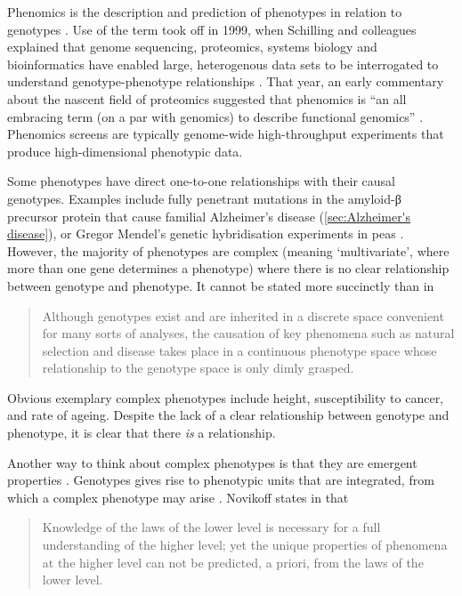 Phenomics is the description and prediction of phenotypes in relation to genotypes \cite{Houle2010a}. Use of the term took off in 1999, when Schilling and colleagues explained that genome sequencing, proteomics, systems biology and bioinformatics have enabled large, heterogenous data sets to be interrogated to understand genotype-phenotype relationships \cite{Shuler1999,Schilling1999}. That year, an early commentary about the nascent field of proteomics suggested that phenomics is ``an all embracing term (on a par with genomics) to describe functional genomics'' \cite{Dove1999}. Phenomics screens are typically genome-wide high-throughput experiments that produce high-dimensional phenotypic data.

Some phenotypes have direct one-to-one relationships with their causal genotypes. Examples include fully penetrant mutations in the amyloid-β precursor protein that cause familial Alzheimer's disease (\ref{sec:Alzheimer's disease}), or Gregor Mendel's genetic hybridisation experiments in peas \cite{Mendel1866}. However, the majority of phenotypes are complex (meaning `multivariate', where more than one gene determines a phenotype) where there is no clear relationship between genotype and phenotype. It cannot be stated more succinctly than in \cite{Houle2010}

\begin{quote}
    Although genotypes exist and are inherited in a discrete space convenient for many sorts of analyses, the causation of key phenomena such as natural selection and disease takes place in a continuous phenotype space whose relationship to the genotype space is only dimly grasped.
\end{quote}

Obvious exemplary complex phenotypes include height, susceptibility to cancer, and rate of ageing. Despite the lack of a clear relationship between genotype and phenotype, it is clear that there \emph{is} a relationship.

Another way to think about complex phenotypes is that they are emergent properties \cite{Novikoff1945}. Genotypes gives rise to phenotypic units that are integrated, from which a complex phenotype may arise \cite{Murren2012}. Novikoff states in \cite{Novikoff1945} that

\begin{quote}
    Knowledge of the laws of the lower level is necessary for a full understanding of the higher level; yet the unique properties of phenomena at the higher level can not be predicted, a priori, from the laws of the lower level.
\end{quote}

